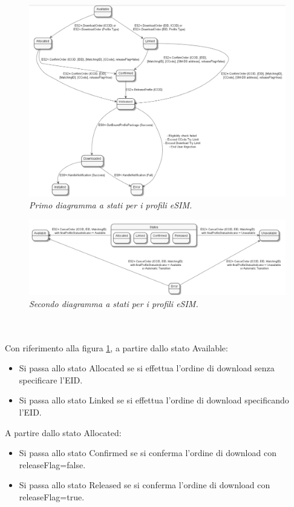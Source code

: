\documentclass[10pt, oneside]{book}
\begin{document}
\begin{figure}
\includegraphics[width=\linewidth]{profile-states1.png}
\caption{\textit{Primo diagramma a stati per i profili eSIM.}}
\label{fig:profile-states1}
\end{figure}
\begin{figure}
\includegraphics[width=\linewidth]{profile-states2.png}
\caption{\textit{Secondo diagramma a stati per i profili eSIM.}}
\label{fig:profile-states2}
\end{figure}
\\
\\Con riferimento alla figura \ref{fig:profile-states1}, a partire dallo stato Available:
\begin{itemize}
\item Si passa allo stato Allocated se si effettua l'ordine di download senza specificare l'EID.
\item Si passa allo stato Linked se si effettua l'ordine di download specificando l'EID.
\end{itemize}
A partire dallo stato Allocated:
\begin{itemize}
\item Si passa allo stato Confirmed se si conferma l'ordine di download con releaseFlag=false.
\item Si passa allo stato Released se si conferma l'ordine di download con releaseFlag=true.
\end{itemize}
\end{document}

